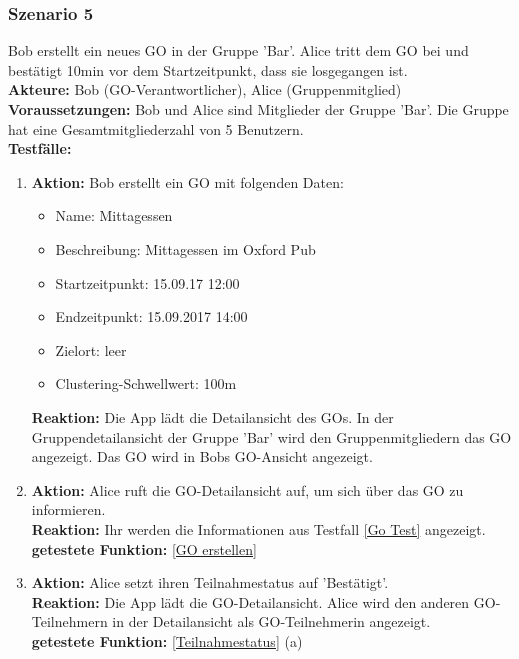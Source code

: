 \documentclass[parskip=full]{scrartcl}
\def\threedigits#1{%
  \ifnum#1<100 0\fi
  \ifnum#1<10 0\fi
  \number#1}
\begin{document}
\subsubsection*{Szenario 5}Bob erstellt ein neues GO in der Gruppe 'Bar'. Alice tritt dem GO bei und bestätigt 10min vor dem Startzeitpunkt, dass sie losgegangen ist.\\

\textbf{Akteure:} Bob (GO-Verantwortlicher), Alice (Gruppenmitglied)\\

\textbf{Voraussetzungen: }Bob und Alice sind Mitglieder der Gruppe 'Bar'. Die Gruppe hat eine Gesamtmitgliederzahl von 5 Benutzern.\\

\textbf{Testfälle:}
\begin{enumerate}[label={\textbf{/T\protect\threedigits{\theenumi}0/}}, leftmargin=*, resume]
	\item\label{Go Test} \textbf{Aktion:} Bob erstellt ein GO mit folgenden Daten:
	\begin{itemize}
		\item Name: Mittagessen
		\item Beschreibung: Mittagessen im Oxford Pub
		\item Startzeitpunkt: 15.09.17 12:00
		\item Endzeitpunkt: 15.09.2017 14:00
		\item Zielort: leer
		\item Clustering-Schwellwert: 100m
	\end{itemize}
	\textbf{Reaktion:} Die App lädt die Detailansicht des GOs. In der Gruppendetailansicht der Gruppe 'Bar' wird den Gruppenmitgliedern das GO angezeigt. Das GO wird in Bobs GO-Ansicht angezeigt.\\
	\item \textbf{Aktion:} Alice ruft die GO-Detailansicht auf, um sich über das GO zu informieren.\\
	\textbf{Reaktion:} Ihr werden die Informationen aus Testfall \ref{Go Test} angezeigt.\\
	\textbf{getestete Funktion:} \ref{GO erstellen}
	\item \textbf{Aktion:} Alice setzt ihren Teilnahmestatus auf 'Bestätigt'.\\
	\textbf{Reaktion:} Die App lädt die GO-Detailansicht. Alice wird den anderen GO-Teilnehmern in der Detailansicht als GO-Teilnehmerin angezeigt.\\
	\textbf{getestete Funktion:} \ref{Teilnahmestatus} (a)

\end{enumerate}
\end{document}

